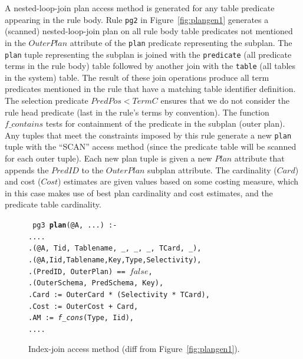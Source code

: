 \documentclass{sigmod08}
\newcommand{\datalogspace}{\textcolor[gray]{1}{.}\hspace{0.5in}}
\newcommand{\ol}[1]{\texttt{\small #1}\xspace}
\begin{document}
A nested-loop-join plan access method is generated for any table predicate appearing
in the rule body. Rule \ol{pg2} in Figure~\ref{fig:plangen1} generates a
(scanned) nested-loop-join 
plan on all rule body table predicates not mentioned in the $OuterPlan$ attribute of the \ol{plan}
predicate representing the subplan. The \ol{plan} tuple representing the subplan is joined with 
the \ol{predicate} (all predicate terms in the rule body) table followed by another join with 
the \ol{table} (all tables in the system) table. The result of these join operations produce all 
term predicates mentioned in the rule that have a matching table identifier definition. 
The selection predicate $PredPos < TermC$ ensures that we do not
consider the rule head predicate (last in the rule's terms by
convention). The function $f\_contains$ tests for containment of the predicate in the subplan (outer plan). 
Any tuples that meet the constraints imposed by this rule generate a new \ol{plan} 
tuple with the ``SCAN'' access method (since the predicate table will be scanned for each outer tuple). 
Each new plan tuple is given a new $Plan$ attribute that appends the $PredID$ to the $OuterPlan$ 
subplan attribute. 
The cardinality ($Card$) and cost ($Cost$) estimates are given values based on some costing 
measure, which in this case makes use of best plan cardinality and cost estimates, and the predicate 
table cardinality.

\begin{figure}
\centering
\begin{boxedminipage}{\linewidth}
\scriptsize{\tt
pg3 {\small \bf plan}(@A, ...) :-\\
\datalogspace ...\\
\datalogspace {\small \bf table}(@A, Tid, Tablename, \_, \_, \_, TCard, \_),\\
\datalogspace {\small \bf index}(@A,Iid,Tablename,Key,Type,Selectivity),\\
\datalogspace {\em f\_contains}(PredID, OuterPlan) == $false$,\\
\datalogspace {\em f\_indexMatch}(OuterSchema, PredSchema, Key),\\
\datalogspace Card   := OuterCard * (Selectivity * TCard),\\
\datalogspace Cost   := OuterCost + Card,\\
\datalogspace AM := {\em f\_cons}(Type, Iid),\\
\datalogspace ...
}
\caption{\label{fig:plangen2}Index-join access method (diff from Figure~\ref{fig:plangen1}).}
\end{boxedminipage}
\end{figure}
\end{document}
